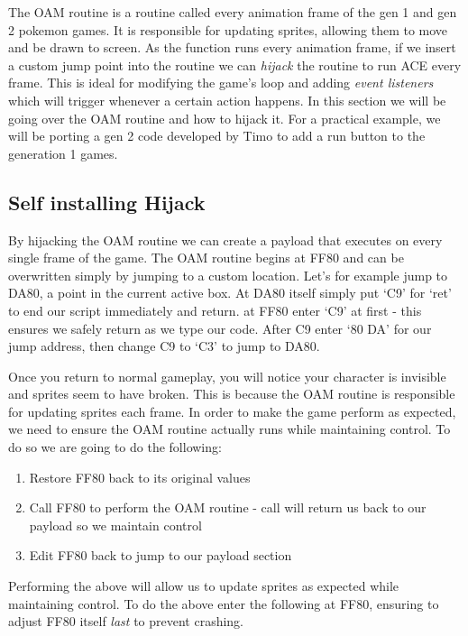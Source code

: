 \documentclass[../main.tex]{subfiles}
\begin{document}
    The OAM routine is a routine called every animation frame of the gen 1 and gen 2 pokemon games.  It is responsible for updating sprites, allowing them to move and be drawn to screen.  As the function runs every animation frame, if we insert a custom jump point into the routine we can \textit{hijack} the routine to run ACE every frame.  This is ideal for modifying the game's loop and adding \textit{event listeners} which will trigger whenever a certain action happens.  In this section we will be going over the OAM routine and how to hijack it.  For a practical example, we will be porting a gen 2 code developed by Timo to add a run button to the generation 1 games.

    \subsection{Self installing Hijack}
    By hijacking the OAM routine we can create a payload that executes on every single frame of the game.  The OAM routine begins at FF80 and can be overwritten simply by jumping to a custom location.  Let's for example jump to DA80, a point in the current active box.  At DA80 itself simply put `C9' for `ret' to end our script immediately and return.  at FF80 enter `C9' at first - this ensures we safely return as we type our code.  After C9 enter `80 DA' for our jump address, then change C9 to `C3' to jump to DA80.

    Once you return to normal gameplay, you will notice your character is invisible and sprites seem to have broken.  This is because the OAM routine is responsible for updating sprites each frame.  In order to make the game perform as expected, we need to ensure the OAM routine actually runs while maintaining control.  To do so we are going to do the following:

    \begin{enumerate}
        \item Restore FF80 back to its original values
        \item Call FF80 to perform the OAM routine - call will return us back to our payload so we maintain control
        \item Edit FF80 back to jump to our payload section
    \end{enumerate}

    Performing the above will allow us to update sprites as expected while maintaining control.  To do the above enter the following at FF80, ensuring to adjust FF80 itself \textit{last} to prevent crashing.
\end{document}
